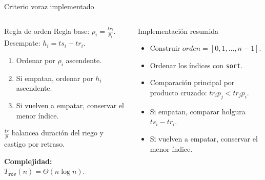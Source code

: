 \documentclass[aspectratio=169]{beamer}
\begin{document}
\begin{frame}{Criterio voraz implementado}
  \begin{columns}[T,onlytextwidth]
    \scriptsize
    \begin{block}{Regla de orden}
      Regla base: \(\rho_i=\frac{tr_i}{p_i}\). Desempate: \(h_i=ts_i-tr_i\).
      \begin{enumerate}
        \setlength{\itemsep}{0.15em}
        \item Ordenar por \(\rho_i\) ascendente.
        \item Si empatan, ordenar por \(h_i\) ascendente.
        \item Si vuelven a empatar, conservar el menor \'indice.
      \end{enumerate}
      \centering
      \(\frac{tr}{p}\) balancea duraci\'on del riego y castigo por retraso.
      
      \medskip
      \textbf{Complejidad:} \(T_{\texttt{roV}}(n)=\Theta(n\log n)\).
    \end{block}

    \tiny
    \begin{block}{Implementaci\'on resumida}
      \begin{itemize}
        \item Construir \(orden=[0,1,\dots,n-1]\).
        \item Ordenar los \'indices con \texttt{sort}.
        \item Comparaci\'on principal por producto cruzado: \(tr_i p_j < tr_j p_i\).
        \item Si empatan, comparar holgura \(ts_i-tr_i\).
        \item Si vuelven a empatar, conservar el menor \'indice.
      \end{itemize}
    \end{block}
  \end{columns}
\end{frame}
\end{document}
